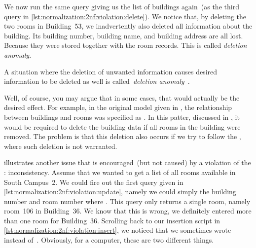 We now run the same query giving us the list of buildings again~(as the third query in \cref{lst:normalization:2nf:violation:delete}).
We notice that, by deleting the two rooms in Building~53, we inadvertently also deleted all information about the building.
Its building number, building name, and building address are all lost.
Because they were stored together with the room records.
This is called \emph{deletion anomaly}.%
%
\begin{definition}%
\label{def:deletionAnomaly}%
A situation where the deletion of unwanted information causes desired information to be deleted as well is called~\emph{deletion anomaly}~\cite{S2024D:RNDAFDNF}.%
\end{definition}%
%
Well, of course, you may argue that in some cases, that would actually be the desired effect.
For example, in the original model given in , the relationship between buildings and rooms was specified as .
In this patter, discussed in , it would be required to delete the building data if all rooms in the building were removed.
The problem is that this deletion also occurs if we try to follow the , where such deletion is not warranted.

 illustrates another issue that is encouraged~(but not caused) by a violation of the : inconsistency.
Assume that we wanted to get a list of all rooms available in South Campus~2.
We could fire out the first query given in \cref{lst:normalization:2nf:violation:update}, namely we could simply  the building number and room number where .
This query only returns a single room, namely room~106 in Building~36.
We know that this is wrong, we definitely entered more than one room for Building~36.
Scrolling back to our insertion script in \cref{lst:normalization:2nf:violation:insert}, we noticed that we sometimes wrote~ instead of~.
Obviously, for a computer, these are two different things.

